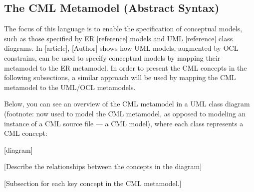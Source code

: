 \subsection{The CML Metamodel (Abstract Syntax)}\label{subsec:metamodel}

The focus of this language is to enable the specification of conceptual models, such as those specified by ER [reference] models and UML [reference] class diagrams. In [article], [Author] shows how UML models, augmented by OCL constrains, can be used to specify conceptual models by mapping their metamodel to the ER metamodel. In order to present the CML concepts in the following subsections, a similar approach will be used by mapping the CML metamodel to the UML/OCL metamodels.

Below, you can see an overview of the CML metamodel in a UML class diagram (footnote: now used to model the CML metamodel, as opposed to modeling an instance of a CML source file --- a CML model), where each class represents a CML concept:

[diagram]

[Describe the relationships between the concepts in the diagram]

[Subsection for each key concept in the CML metamodel.]